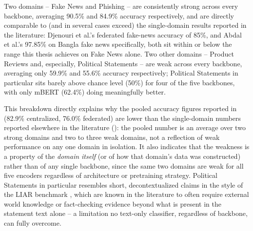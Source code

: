 \begin{table}[htbp]
\centering
\caption{Centralized test accuracy by deception domain, for all five backbones. }
\label{tab:domain-breakdown}
\end{table}

Two domains -- Fake News and Phishing -- are consistently strong across every backbone, averaging 90.5\% and 84.9\% accuracy respectively, and are directly comparable to (and in several cases exceed) the single-domain results reported in the literature: Djenouri et al.'s \cite{djenouri2024federated} federated fake-news accuracy of 85\%, and Abdal et al.'s \cite{abdal2023transformer} 97.85\% on Bangla fake news specifically, both sit within or below the range this thesis achieves on Fake News alone. Two other domains -- Product Reviews and, especially, Political Statements -- are weak across every backbone, averaging only 59.9\% and 55.6\% accuracy respectively; Political Statements in particular sits barely above chance level (50\%) for four of the five backbones, with only mBERT (62.4\%) doing meaningfully better.

This breakdown directly explains why the pooled accuracy figures reported in  (82.9\% centralized, 76.0\% federated) are lower than the single-domain numbers reported elsewhere in the literature (): the pooled number is an average over two strong domains and two to three weak domains, not a reflection of weak performance on any one domain in isolation. It also indicates that the weakness is a property of the \emph{domain itself} (or of how that domain's data was constructed) rather than of any single backbone, since the same two domains are weak for all five encoders regardless of architecture or pretraining strategy. Political Statements in particular resembles short, decontextualized claims in the style of the LIAR benchmark \cite{wang2017liar}, which are known in the literature to often require external world knowledge or fact-checking evidence beyond what is present in the statement text alone \cite{thorne2018fever} -- a limitation no text-only classifier, regardless of backbone, can fully overcome.

